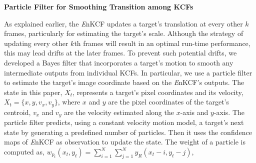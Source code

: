 \documentclass[10pt,twocolumn,letterpaper]{article}
\begin{document}
\textbf{Particle Filter for Smoothing Transition among KCFs}

As explained earlier, the {\it E}nKCF updates a target's translation
at every other $k$ frames, particularly for estimating the target's
scale. Although the strategy of updating every other $k$th frames will
result in an optimal run-time performance, this may lead drifts at the
later frames. To prevent such potential drifts, we developed a Bayes
filter that incorporates a target's motion to smooth any intermediate
outputs from individual KCFs. In particular, we use a particle filter
to estimate the target's image coordinate based on the {\it E}nKCF's
outputs. The state in this paper, $X_t$, represents a target's pixel
coordinates and its velocity, $X_t = \lbrace x, y, v_{x}, v_{y}
\rbrace$, where $x$ and $y$ are the pixel coordinates of the target's
centroid, $v_x$ and $v_y$ are the velocity estimated along the
$x$-axis and $y$-axis. The particle filter predicts, using a constant
velocity motion model, a target's next state by generating a predefined
number of particles. Then it uses the confidence maps of {\it E}nKCF
as observation to update the state. The weight of a particle is
computed as, $w_{p_{t}}(x_{t},y_{t}) = \sum_{i=1}^{N}\sum_{j=1}^{N} y_{R}(x_{t}-i,y_{t}-j)$,
\end{document}
